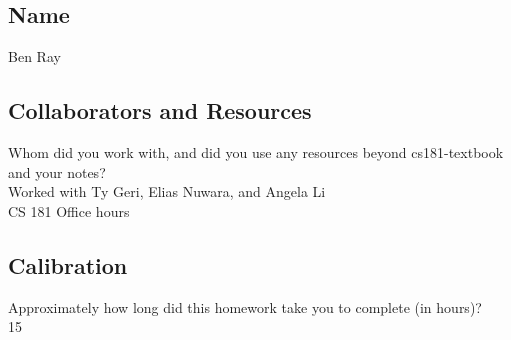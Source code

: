 \documentclass[submit]{harvardml}
\begin{document}
\newpage
\subsection*{Name}
Ben Ray

\subsection*{Collaborators and Resources}
Whom did you work with, and did you use any resources beyond cs181-textbook and your notes?\\
Worked with Ty Geri, Elias Nuwara, and Angela Li\\
CS 181 Office hours

\subsection*{Calibration}
Approximately how long did this homework take you to complete (in hours)?\\
15
\end{document}
